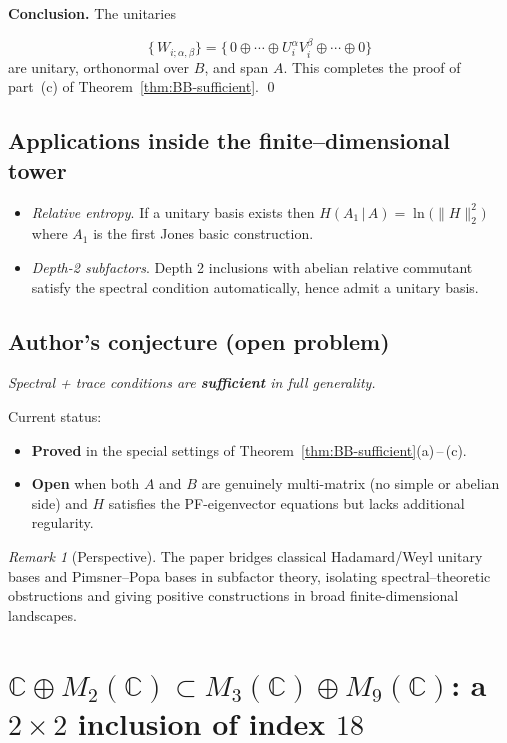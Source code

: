 \documentclass[11pt]{article}
\theoremstyle{mytheoremstyle}
\theoremstyle{definition}
\theoremstyle{remark}
\newtheorem{remark}[theorem]{\color{MyDarkGreen}Remark}
\newcommand{\bbC}{\mathbb{C}}
\begin{document}
\medskip
\noindent\textbf{Conclusion.}
The unitaries

\[
  \{\,W_{i;\alpha,\beta}\} = \{\,0\oplus\cdots\oplus U_i^\alpha V_i^\beta\oplus\cdots\oplus0\}
\]
are unitary, orthonormal over $B$, and span $A$.  This completes the proof
of part~\textup{(c)} of Theorem~\ref{thm:BB-sufficient}.
\qed


\newpage
\subsection*{Applications inside the finite–dimensional tower}
\begin{itemize}[leftmargin=1.8em]
  \item \emph{Relative entropy}. 
        If a unitary basis exists then
        \( H(A_1\,|\,A)=\ln\!\bigl(\|H\|_2^{2}\bigr) \)
        where $A_1$ is the first Jones basic construction.
  \item \emph{Depth-2 subfactors}. 
        Depth 2 inclusions with abelian relative commutant
        satisfy the spectral condition automatically,
        hence admit a unitary basis.
\end{itemize}

\subsection*{Author’s conjecture (open problem)}
\begin{center}
\emph{Spectral + trace conditions are \textbf{sufficient} in full generality.}
\end{center}
Current status:
\begin{itemize}[leftmargin=1.8em]
  \item \textbf{Proved} in the special settings of
        Theorem~\ref{thm:BB-sufficient}(a)\,–\,(c).
  \item \textbf{Open} when both $A$ and $B$ are genuinely multi-matrix
        (no simple or abelian side) and $H$ satisfies the PF-eigenvector
        equations but lacks additional regularity.
\end{itemize}

\begin{remark}[Perspective]
The paper bridges classical Hadamard/Weyl unitary bases and
Pimsner–Popa bases in subfactor theory, isolating
spectral–theoretic obstructions and giving positive constructions
in broad finite-dimensional landscapes.
\end{remark}


\newpage
\section{\texorpdfstring{$\bbC\oplus M_{2}(\bbC)\subset M_{3}(\bbC)\oplus M_{9}(\bbC)$}{C ⊕ M₂ ⊂ M₃ ⊕ M₉}: a $2\times2$ inclusion of index $18$}
\label{subsec:2x2-index18}
\end{document}
